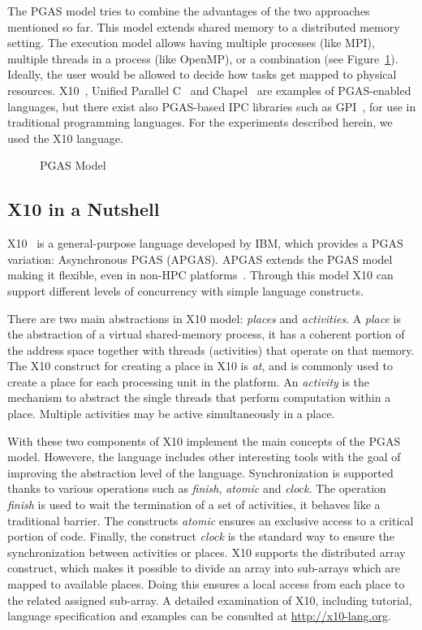 \documentclass{llncs}
\begin{document}
The PGAS model tries to combine the advantages of the two approaches
mentioned so far.  This model extends shared memory to a distributed
memory setting.  The execution model allows having multiple processes
(like MPI), multiple threads in a process (like OpenMP), or a
combination (see Figure~\ref{fig:PGASModel}).  Ideally, the user would
be allowed to decide how tasks get mapped to physical resources.
X10~\cite{Saraswat2012}, Unified Parallel C~\cite{UPCConsortium2005}
and Chapel~\cite{CrayInc.2012} are examples of PGAS-enabled languages,
but there exist also PGAS-based IPC libraries such as
GPI~\cite{Machado2009}, for use in traditional programming languages.
For the experiments described herein, we used the X10 language.

\begin{figure}[h]
\centerline{} 
\caption{PGAS Model}\label{fig:PGASModel}
\end{figure}

\subsection{X10 in a Nutshell}
\label{sec:X10}
X10~\cite{Saraswat2012} is a general-purpose language developed by
IBM, which provides a PGAS variation: Asynchronous PGAS (APGAS). APGAS
extends the PGAS model making it flexible, even in non-HPC
platforms~\cite{Saraswat2010}. Through this model X10 can support
different levels of concurrency with simple language constructs.

There are two main abstractions in X10 model: \emph{places} and
\emph{activities}. A \emph{place} is the abstraction of a virtual
shared-memory process, it has a coherent portion of the address space
together with threads (activities) that operate on that memory. The
X10 construct for creating a place in X10 is \emph{at}, and is commonly
used to create a place for each processing unit in the platform. An
\emph{activity} is the mechanism to abstract the single threads that
perform computation within a place. Multiple activities may be active
simultaneously in a place.

With these two components of X10 implement the main concepts of the
PGAS model.  Howevere, the language includes other interesting tools
with the goal of improving the abstraction level of the language.
Synchronization is supported thanks to various operations such as
\emph{finish}, \emph{atomic} and \emph{clock}. The operation
\emph{finish} is used to wait the termination of a set of activities,
it behaves like a traditional barrier. The constructs \emph{atomic}
ensures an exclusive access to a critical portion of code. Finally,
the construct \emph{clock} is the standard way to ensure the
synchronization between activities or places.  X10 supports the
distributed array construct, which makes it possible to divide an
array into sub-arrays which are mapped to available places. Doing this
ensures a local access from each place to the related assigned
sub-array. A detailed examination of X10, including tutorial, language
specification and examples can be consulted at
\url{http://x10-lang.org}.
\end{document}

